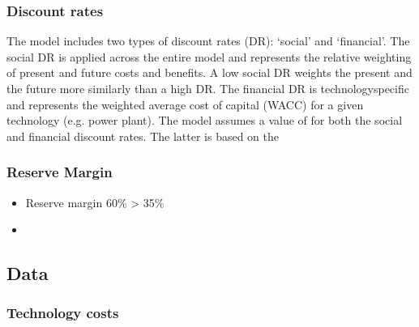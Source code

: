\documentclass[a4paper,11pt,english]{sphinxmanual}
\begin{document}
\subsubsection{Discount rates}
\label{\detokenize{1_indonesia:discount-rates}}
\sphinxAtStartPar
The model includes two types of discount rates (DR): ‘social’ and ‘financial’.
The social DR is applied across the entire model and represents the relative
weighting of present and future costs and benefits. A low social DR weights the
present and the future more similarly than a high DR. The financial DR is
technology\sphinxhyphen{}specific and represents the weighted average cost of capital (WACC)
for a given technology (e.g. power plant). The model assumes a value of
 for both the social and financial discount rates. The latter is based
on the 


\subsubsection{Reserve Margin}
\label{\detokenize{1_indonesia:reserve-margin}}\begin{itemize}
\item {} 
\sphinxAtStartPar
Reserve margin 60\% \sphinxhyphen{}\textgreater{} 35\%

\item {} 
\end{itemize}


\subsection{Data}
\label{\detokenize{1_indonesia:data}}

\subsubsection{Technology costs}
\label{\detokenize{1_indonesia:technology-costs}}
\sphinxAtStartPar
{}
\end{document}
